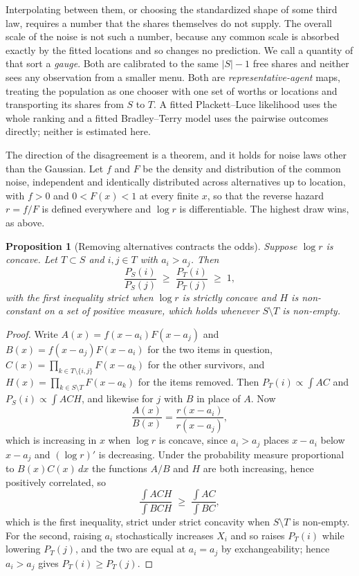 \documentclass[11pt]{article}
\newtheorem{proposition}{Proposition}
\begin{document}
Interpolating between them, or choosing the standardized shape of some third law, requires a
number that the shares themselves do not supply. The overall scale of the noise is not such a
number, because any common scale is absorbed exactly by the fitted locations and so changes no
prediction. We call a quantity of that sort a \emph{gauge}. Both are calibrated
to the same $|S|-1$ free shares and neither sees any observation from a smaller menu. Both are
\emph{representative-agent} maps, treating the population as one chooser with one set of
worths or locations and transporting its shares from $S$ to $T$. A fitted Plackett--Luce
likelihood \cite{plackett1975} uses the whole ranking and a fitted Bradley--Terry model
\cite{bradley1952} uses the pairwise outcomes directly; neither is estimated here.

The direction of the disagreement is a theorem, and it holds for noise laws other than
the Gaussian. Let $f$ and $F$ be the density and distribution of the common noise, independent and
identically distributed across alternatives up to location, with $f > 0$ and $0 < F(x) < 1$ at
every finite $x$, so that the reverse hazard $r = f/F$ is defined everywhere and $\log r$ is
differentiable. The highest draw wins, as above.

\begin{proposition}[Removing alternatives contracts the odds]
\label{prop:contraction}
Suppose $\log r$ is concave. Let $T \subset S$ and $i,j \in T$ with $a_i > a_j$. Then
\[
\frac{P_S(i)}{P_S(j)} \;\ge\; \frac{P_T(i)}{P_T(j)} \;\ge\; 1,
\]
with the first inequality strict when $\log r$ is strictly concave and $H$ is non-constant on a
set of positive measure, which holds whenever $S \setminus T$ is non-empty.
\end{proposition}

\begin{proof}
Write $A(x) = f(x-a_i)F(x-a_j)$ and $B(x) = f(x-a_j)F(x-a_i)$ for the two items in
question, $C(x) = \prod_{k \in T \setminus \{i,j\}} F(x-a_k)$ for the other survivors, and
$H(x) = \prod_{k \in S \setminus T} F(x-a_k)$ for the items removed. Then
$P_T(i) \propto \int A C$ and $P_S(i) \propto \int A C H$, and likewise for $j$
with $B$ in place of $A$. Now
\[
\frac{A(x)}{B(x)} = \frac{r(x-a_i)}{r(x-a_j)},
\]
which is increasing in $x$ when $\log r$ is concave, since $a_i > a_j$ places $x-a_i$ below
$x-a_j$ and $(\log r)'$ is decreasing. Under the probability measure proportional to
$B(x)C(x)\,dx$ the functions $A/B$ and $H$ are both increasing, hence positively
correlated, so
\[
\frac{\int A C H}{\int B C H} \;\ge\; \frac{\int A C}{\int B C},
\]
which is the first inequality, strict under strict concavity when $S \setminus T$ is
non-empty. For the second, raising $a_i$ stochastically increases $X_i$ and so raises
$P_T(i)$ while lowering $P_T(j)$, and the two are equal at $a_i = a_j$ by
exchangeability; hence $a_i > a_j$ gives $P_T(i) \ge P_T(j)$.
\end{proof}
\end{document}
